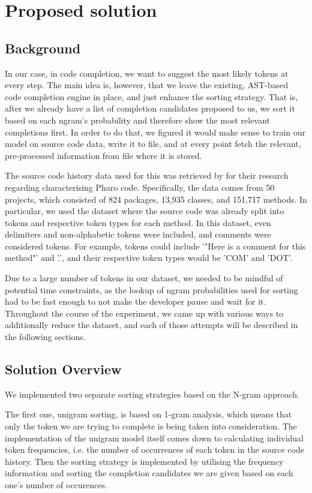 \chapter{Proposed solution}
\label{chap:Proposed solution}

\section{Background}
In our case, in code completion, we want to suggest the most likely tokens at every step. The main idea is, however, that we leave the existing, AST-based code completion engine in place, and just enhance the sorting strategy. That is, after we already have a list of completion candidates proposed to us, we sort it based on each ngram's probability and therefore show the most relevant completions first. In order to do that, we figured it would make sense to train our model on source code data, write it to file, and at every point fetch the relevant, pre-processed information from file where it is stored.

The source code history data used for this was retrieved by \cite{Zait20a} for their research regarding characterising Pharo code. Specifically, the data comes from 50 projects, which consisted of 824 packages, 13,935 classes, and 151,717 methods. In particular, we used the dataset where the source code was already split into tokens and respective token types for each method. In this dataset, even delimiters and non-alphabetic tokens were included, and comments were considered tokens. For example, tokens could include '"Here is a comment for this method"' and '.', and their respective token types would be 'COM' and 'DOT'.

Due to a large number of tokens in our dataset, we needed to be mindful of potential time constraints, as the lookup of ngram probabilities used for sorting had to be fast enough to not make the developer pause and wait for it. Throughout the course of the experiment, we came up with various ways to additionally reduce the dataset, and each of those attempts will be described in the following sections.

\section{Solution Overview}
We implemented two separate sorting strategies based on the N-gram approach.

The first one, unigram sorting, is based on 1-gram analysis, which means that only the token we are trying to complete is being taken into consideration. The implementation of the unigram model itself comes down to calculating individual token frequencies, i.e. the number of occurrences of each token in the source code history. Then the sorting strategy is implemented by utilising the frequency information and sorting the completion candidates we are given based on each one's number of occurences.

